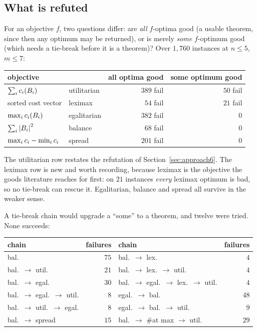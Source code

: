 \subsection{What is refuted}

For an objective $f$, two questions differ: are \emph{all} $f$-optima good (a
usable theorem, since then any optimum may be returned), or is merely
\emph{some} $f$-optimum good (which needs a tie-break before it is a theorem)?
Over $1{,}760$ instances at $n \le 5$, $m \le 7$:

\begin{center}
\begin{tabular}{llrr}
\toprule
objective & & all optima good & some optimum good \\
\midrule
$\sum_i c_i(B_i)$ & utilitarian    & $389$ fail & $50$ fail \\
sorted cost vector    & leximax        & $54$ fail  & $21$ fail \\
\midrule
$\max_i c_i(B_i)$ & egalitarian    & $382$ fail & $0$ \\
$\sum_i \left\lvert B_i\right\rvert^2$  & balance        & $68$ fail  & $0$ \\
$\max_i c_i - \min_i c_i$ & spread & $201$ fail & $0$ \\
\bottomrule
\end{tabular}
\end{center}

The utilitarian row restates the refutation of Section~\ref{sec:approach6}. The
leximax row is new and worth recording, because leximax is the objective the
goods literature reaches for first: on $21$ instances \emph{every} leximax
optimum is bad, so no tie-break can rescue it. Egalitarian, balance and spread
all survive in the weaker sense.

A tie-break chain would upgrade a ``some'' to a theorem, and twelve were tried.
None succeeds:

\begin{center}
\begin{tabular}{lr@{\qquad}lr}
\toprule
chain & failures & chain & failures \\
\midrule
bal.                       & $75$ & bal.\ $\to$ lex.          & $4$ \\
bal.\ $\to$ util.          & $21$ & bal.\ $\to$ lex.\ $\to$ util. & $4$ \\
bal.\ $\to$ egal.          & $30$ & bal.\ $\to$ egal.\ $\to$ lex.\ $\to$ util. & $4$ \\
bal.\ $\to$ egal.\ $\to$ util. & $8$ & egal.\ $\to$ bal.    & $48$ \\
bal.\ $\to$ util.\ $\to$ egal. & $8$ & egal.\ $\to$ bal.\ $\to$ util. & $9$ \\
bal.\ $\to$ spread         & $15$ & bal.\ $\to$ \#at max $\to$ util. & $29$ \\
\bottomrule
\end{tabular}
\end{center}

